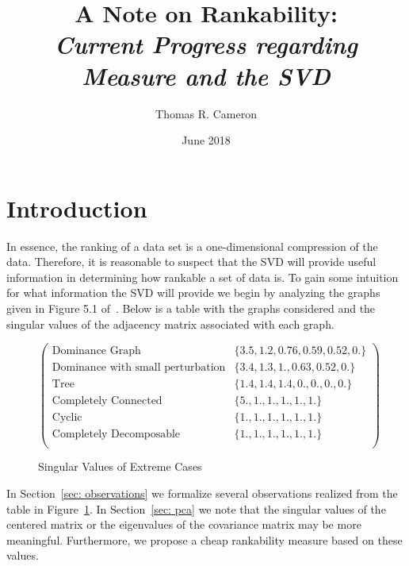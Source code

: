 \documentclass{article}
\title{A Note on Rankability:\\
\emph{\large{Current Progress regarding Measure and the SVD}}}
\author{Thomas R. Cameron}
\date{June 2018}
\begin{document}
\maketitle
{}

\section{Introduction}	
In essence, the ranking of a data set is a one-dimensional compression of the data. 
Therefore, it is reasonable to suspect that the SVD will provide useful information in determining how rankable a set of data is. 
To gain some intuition for what information the SVD will provide we begin by analyzing the graphs given in Figure 5.1 of~\cite{Anderson}. 
Below is a table with the graphs considered and the singular values of the adjacency matrix associated with each graph. 

\begin{figure}[h]
\centering
\[
\left(
\begin{array}{cc}
 \text{Dominance Graph} & \{3.5,1.2,0.76,0.59,0.52,0.\} \\
 \text{Dominance with small perturbation} & \{3.4,1.3,1.,0.63,0.52,0.\} \\
 \text{Tree} & \{1.4,1.4,1.4,0.,0.,0.,0.\} \\
 \text{Completely Connected} & \{5.,1.,1.,1.,1.,1.\} \\
 \text{Cyclic} & \{1.,1.,1.,1.,1.,1.\} \\
 \text{Completely Decomposable} & \{1.,1.,1.,1.,1.,1.\} \\
\end{array}
\right)
\]
\caption{Singular Values of Extreme Cases}
\label{fig: table}
\end{figure}

In Section~\ref{sec: observations} we formalize several observations realized from the table in Figure~\ref{fig: table}.
In Section~\ref{sec: pca} we note that the singular values of the centered matrix or the eigenvalues of the covariance matrix may be more meaningful.
Furthermore, we propose a cheap rankability measure based on these values. 
\end{document}
